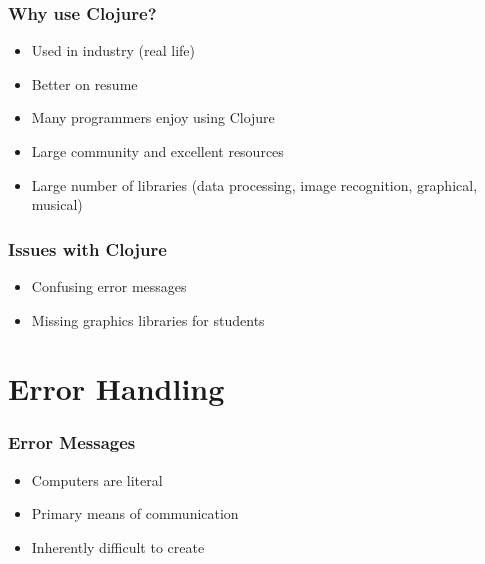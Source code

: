 \documentclass{beamer}
\begin{document}
\begin{frame}
	\frametitle{Why use Clojure?}
	\begin{itemize}
		\item Used in industry (real life)
		\item Better on resume
		\item Many programmers enjoy using Clojure
		\item Large community and excellent resources
		\item Large number of libraries (data processing, image recognition, graphical, musical)
	\end{itemize}
\end{frame}

\begin{frame}
	\frametitle{Issues with Clojure}
	\begin{itemize}
		\item Confusing error messages
		\item Missing graphics libraries for students
	\end{itemize}
\end{frame}

\section{Error Handling}

\begin{frame}
	\frametitle{Error Messages}
	\begin{itemize}
		\item Computers are literal
		\item Primary means of communication
		\item Inherently difficult to create
	\end{itemize}
\end{frame}
\end{document}
